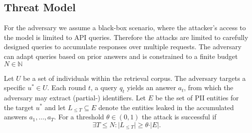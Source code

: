 \subsection{Threat Model}\label{background-sec:threat-model}
For the adversary we assume a black-box scenario, where the attacker's access to the model is limited to API queries. Therefore the attacks are limited to carefully designed queries to accumulate responses over multiple requests. The adversary can adapt queries based on prior answers and is constrained to a finite budget $N \in \mathbb{N}$

Let $U$ be a set of individuals within the retrieval corpus. The adversary targets a specific $u^* \in U$. Each round $t$, a query $q_t$ yields an answer $a_t$, from which the adversary may extract (partial-) identifiers. 
Let $E$ be the set of PII entities for the target $u^*$ and let $L_{\leq T}\subseteq E$ denote the entities leaked in the accumulated answers $a_1,\dots,a_T$. For a threshold $\theta\in(0,1)$ the attack is successful if
\[
    \exists T \leq N: \vert L_{\leq T}\vert \geq \theta \cdot \vert E\vert.
\]


